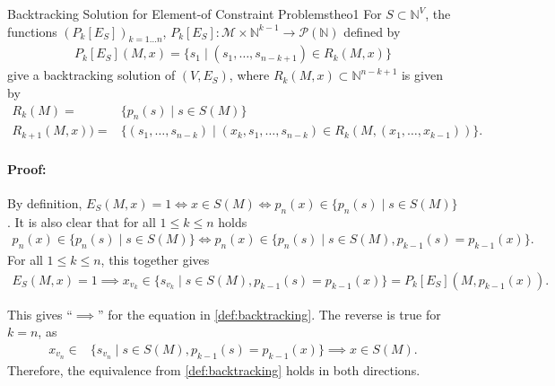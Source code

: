 \begin{theorem}{Backtracking Solution for Element-of Constraint Problems}{theo1}
    For $S\subset\mathbb N^V$, the functions $(P_k[E_S])_{k=1\dots n}$,
    $P_k[E_S]\colon\mathcal M\times\mathbb N^{k-1}\rightarrow\mathcal P(\mathbb N)$
    defined by
    \begin{align*}
        P_k[E_S](M,x)=\{s_1\mid(s_1,\dots,s_{n-k+1})\in R_k(M,x)\}
    \end{align*}
    give a backtracking solution of $(V,E_S)$, where
    $R_k(M,x)\subset\mathbb N^{n-k+1}$ is given by
    \begin{align*}
        R_k(M)={}&\{p_n(s)\mid s\in S(M)\}\\[-0.15em]
        R_{k+1}(M,x))={}&\{(s_1,\dots,s_{n-k})\mid (x_k,s_1,\dots,s_{n-k})\in R_k(M,(x_1,\dots,x_{k-1}))\}.
    \end{align*}
    \tcblower
    \paragraph*{Proof:} By definition,
    $E_S(M,x)=1\iff x\in S(M)\iff p_n(x)\in\{p_n(s)\mid s\in S(M)\}$.
    It is also clear that for all $1\leq k\leq n$ holds
    \begin{align*}
        p_n(x)\in\{p_n(s)\mid s\in S(M)\}\iff p_n(x)\in\{p_n(s)\mid s\in S(M),p_{k-1}(s)=p_{k-1}(x)\}.
    \end{align*}
    For all $1\leq k\leq n$, this together gives
    \begin{align*}
        E_S(M,x)=1\implies x_{v_k}\in\{s_{v_k}\mid s\in S(M),p_{k-1}(s)=p_{k-1}(x)\}=P_k[E_S](M,p_{k-1}(x)).
    \end{align*}

    This gives ``$\implies$'' for the equation in \autoref{def:backtracking}.
    The reverse is true for $k=n$, as
    \begin{align*}
        x_{v_n}\in{}&\{s_{v_n}\mid s\in S(M),p_{k-1}(s)=p_{k-1}(x)\}\implies x\in S(M).
    \end{align*}
    Therefore, the equivalence from \autoref{def:backtracking} holds in both directions.
\end{theorem}
